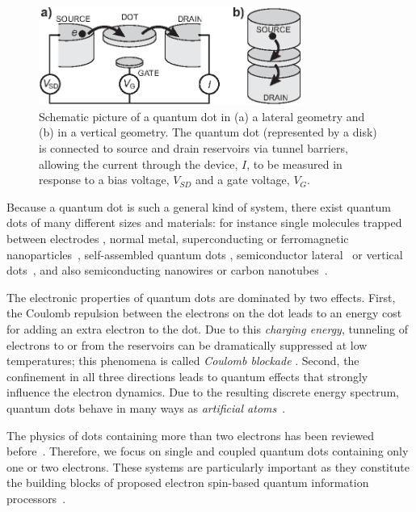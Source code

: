 \documentclass[12pt,aps,nofootinbib]{revtex4-1}
\begin{document}
\begin{figure}[htb]
\includegraphics[width=3.4in, clip=true]{hanson_fig01.eps}
\caption{ Schematic picture of a quantum dot in (a) a lateral
geometry and (b) in a vertical geometry. The quantum dot
(represented by a disk) is connected to source and drain
reservoirs via tunnel barriers, allowing the current through the
device, $I$, to be measured in response to a bias voltage,
$V_{SD}$ and a gate voltage, $V_G$. } \label{fig1:lateraldot}
\end{figure}

Because a quantum dot is such a general kind of system, there
exist quantum dots of many different sizes and materials: for
instance single molecules trapped between electrodes
\cite{Pasupathy}, normal metal\cite{Petta_spin_orbit},
superconducting \cite{Ralph_PRL,RalphReview01} or ferromagnetic
nanoparticles~\cite{Gueron}, self-assembled quantum dots
\cite{McEuen}, semiconductor lateral~\cite{Kouwenhoven97} or
vertical dots~\cite{kouwenhoven01}, and also semiconducting nanowires
or carbon nanotubes~\cite{Bjork_nanowire_dot,dekker99,mceuen2000}.

The electronic properties of quantum dots are dominated by two
effects. First, the Coulomb repulsion between the electrons on the
dot leads to an energy cost for adding an extra electron to the
dot. Due to this \textit{charging energy}, tunneling of electrons
to or from the reservoirs can be dramatically suppressed at low
temperatures; this phenomena is called \textit{Coulomb blockade}
\cite{Beenakker}. Second, the confinement in all three directions
leads to quantum effects that strongly influence the electron
dynamics. Due to the resulting discrete energy spectrum, quantum
dots behave in many ways as \emph{artificial
atoms}~\cite{kouwenhoven01}.

The physics of dots containing more than two electrons has been
reviewed before~\cite{Kouwenhoven97,ReimannRMP}. Therefore, we
focus on single and coupled quantum dots containing only one or
two electrons. These systems are particularly important as they
constitute the building blocks of proposed electron spin-based
quantum information
processors~\cite{LossDiVincenzo,DiVincenzoNature2000,Levy,wulidar02a, wulidar02b,ByrdLidar,Meier,Kyriakidis2005,TaylerNaturePhysics2005,hanson06}.
\end{document}
